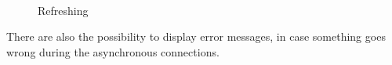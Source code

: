 \begin{figure}[H]
        \myfloatalign
         \quad
         \\
        \caption[Refreshing]{Refreshing}
\end{figure}
\newpage

There are also the possibility to display error messages, in case something goes wrong during the asynchronous connections.

